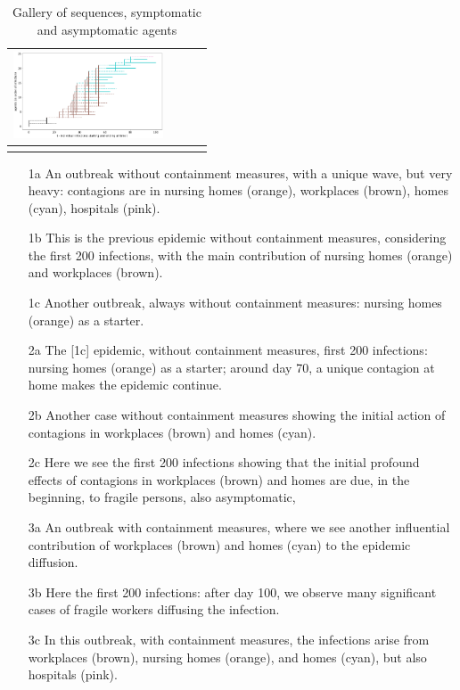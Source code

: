 \documentclass[graybox]{svmult}
\begin{document}
\begin{table}[t]
\begin{tabular}{cccc}
 \includegraphics[width=12em]{sequences/withShort2.png} %
\\
 \hline\noalign{\smallskip}
 \end{tabular}
 \caption{Gallery of sequences, symptomatic and asymptomatic agents}
 \label{gallery}
 \end{table}


\begin{itemize}
\item [1a] An outbreak without containment measures, with a unique wave, but very heavy: contagions are in nursing homes (orange), workplaces (brown), homes (cyan), hospitals (pink).
\item [1b] This is the previous epidemic without containment measures, considering the first 200 infections, with the main contribution of nursing homes (orange) and workplaces (brown).
\item [1c] Another outbreak, always without containment measures: nursing homes (orange) as a starter.

\item [2a] The [1c] epidemic, without containment measures, first 200 infections: nursing homes (orange) as a starter; around day 70, a unique contagion at home makes the epidemic continue.
\item [2b] Another case without containment measures showing the initial action of contagions in workplaces (brown) and homes (cyan).
\item [2c] Here we see the first 200 infections showing that the initial profound effects of contagions in workplaces (brown) and homes are due, in the beginning, to fragile persons, also asymptomatic,

\item [3a] An outbreak with containment measures, where we see another influential contribution of workplaces (brown) and homes (cyan) to the epidemic diffusion.
\item [3b] Here the first 200 infections: after day 100, we observe many significant cases of fragile workers diffusing the infection.
\item [3c] In this outbreak, with containment measures, the infections arise from workplaces (brown), nursing homes (orange), and homes (cyan), but also hospitals (pink).


\end{itemize}
\end{document}
